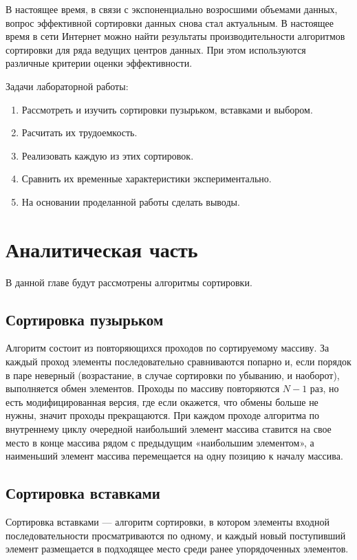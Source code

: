 \documentclass[14pt,russian]{scrartcl}
\begin{document}
В настоящее время, в связи с экспоненциально возросшими объемами данных, вопрос эффективной сортировки данных снова стал актуальным. В настоящее время в сети Интернет можно найти результаты производительности алгоритмов сортировки для ряда ведущих центров данных.
При этом используются различные критерии оценки эффективности. 

Задачи лабораторной работы:

\begin{enumerate}
    \item Рассмотреть и изучить сортировки пузырьком, вставками и выбором.
    \item Расчитать их трудоемкость.
    \item Реализовать каждую из этих сортировок.
    \item Сравнить их временные характеристики экспериментально.
    \item На основании проделанной работы сделать выводы.
\end{enumerate}

\section{Аналитическая часть}
В данной главе будут рассмотрены алгоритмы сортировки.

\subsection{Сортировка пузырьком}


Алгоритм состоит из повторяющихся проходов по сортируемому массиву. За каждый проход элементы последовательно сравниваются попарно и, если порядок в паре неверный (возрастание, в случае сортировки по убыванию, и наоборот), выполняется обмен элементов. Проходы по массиву повторяются $N - 1$ раз, но есть модифицированная версия, где если окажется, что обмены больше не нужны, значит проходы прекращаются. При каждом проходе алгоритма по внутреннему циклу очередной наибольший элемент массива ставится на свое место в конце массива рядом с предыдущим «наибольшим элементом», а наименьший элемент массива перемещается на одну позицию к началу массива.

\subsection{Сортировка вставками}

Сортировка вставками — алгоритм сортировки, в котором элементы входной последовательности просматриваются по одному, и каждый новый поступивший элемент размещается в подходящее место среди ранее упорядоченных элементов.
\end{document}
